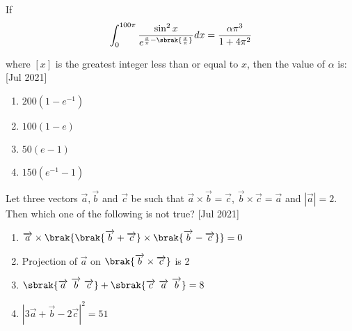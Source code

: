 	\item{
			If  $$\int_0^{100\pi} \frac{\sin^2 x}{e^{\frac{x}{\pi} - \sbrak{\frac{x}{\pi}}}} dx = \frac{\alpha \pi^3}{1+ 4\pi^2}$$
			
			where $[x]$ is the greatest integer less than or equal to $x$, then the value of $\alpha$ is:
			\\ \text{ }
			\hfill
			{[Jul 2021]}
			
			\begin{multicols}{4}
				\begin{enumerate}
					\item $200(1 - e ^{-1})$
					\item $100(1 - e)$
					\item $50(e - 1)$
					\item $150(e^{-1} - 1)$
				\end{enumerate}
			\end{multicols}
			
		}
 	\item{
			Let three vectors $\overrightarrow{a},\overrightarrow{b}$ and $\overrightarrow{c}$ be such that $\overrightarrow{a} \times \overrightarrow{b} = \overrightarrow{c}$, $\overrightarrow{b} \times \overrightarrow{c} =\overrightarrow{a}$ and $|\overrightarrow{a}| = 2$. Then which one of the following is not true?\text{ }
			\hfill
			{[Jul 2021]}
			
			\begin{multicols}{2}
				\begin{enumerate}
					\item $\overrightarrow{a}\times\brak{\brak{\overrightarrow{b}+\overrightarrow{c}}\times\brak{\overrightarrow{b}-\overrightarrow{c}}} = 0$
					\item Projection of $\overrightarrow{a}$ on $\brak{\overrightarrow{b}\times\overrightarrow{c}}$ is 2
					\item $\sbrak{\overrightarrow{a}\text{ }\overrightarrow{b}\text{ }\overrightarrow{c}}+\sbrak{\overrightarrow{c}\text{ }\overrightarrow{a}\text{ }\overrightarrow{b}} =8$
					\item $|3\overrightarrow{a}+\overrightarrow{b}  -2\overrightarrow{c}|^2 = 51$
				\end{enumerate}
			\end{multicols}
			
		}
